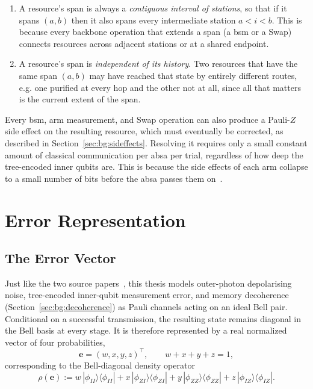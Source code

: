 \begin{enumerate}
    \item A resource's span is always a \emph{contiguous interval of stations}, so that if it spans $(a,b)$ then it also spans every intermediate station $a < i < b$. This is because every backbone operation that extends a span (a \Gls{bsm} or a Swap) connects resources across adjacent stations or at a shared endpoint.
    \item A resource's span is \emph{independent of its history}. Two resources that have the same span $(a,b)$ may have reached that state by entirely different routes, e.g. one purified at every hop and the other not at all, since all that matters is the current extent of the span.
\end{enumerate}

Every \Gls{bsm}, arm measurement, and Swap operation can also produce a Pauli-$Z$ side effect on the resulting resource, which must eventually be corrected, as described in Section~\ref{sec:bg:sideffects}. Resolving it requires only a small constant amount of classical communication per \Gls{absa} per trial, regardless of how deep the tree-encoded inner qubits are. This is because the side effects of each arm collapse to a small number of bits before the \Gls{absa} passes them on~\cite{Benchasattabuse2026Bridging}.

\section{Error Representation}
\label{sec:bg:errors}

\subsection{The Error Vector}
\label{sec:bg:errorvec}

Just like the two source papers~\cite{Benchasattabuse2026Bridging,Benchasattabuse2025Integrating}, this thesis models outer-photon depolarising noise, tree-encoded inner-qubit measurement error, and memory decoherence (Section~\ref{sec:bg:decoherence}) as Pauli channels acting on an ideal Bell pair. Conditional on a successful transmission, the resulting state remains diagonal in the Bell basis at every stage. It is therefore represented by a real normalized vector of four probabilities,
\begin{equation}
    \mathbf{e} = (w, x, y, z)^\top,
    \qquad w+x+y+z=1,
    \label{eq:errorvec}
\end{equation}
corresponding to the Bell-diagonal density operator
\begin{equation}
    \rho(\mathbf{e}) := w\,|\phi_{II}\rangle\!\langle\phi_{II}|
        + x\,|\phi_{ZI}\rangle\!\langle\phi_{ZI}|
        + y\,|\phi_{ZZ}\rangle\!\langle\phi_{ZZ}|
        + z\,|\phi_{IZ}\rangle\!\langle\phi_{IZ}|.
    \label{eq:bell-diagonal-state}
\end{equation}

